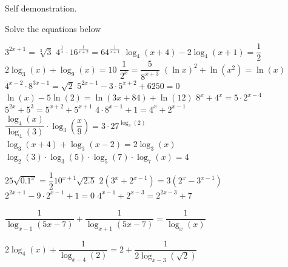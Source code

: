 \begin{Answer}\phantom{}
   Self demonstration.
\end{Answer}

\begin{Exercise} Solve the equations below
\begin{multicols}{2}
    \Question[difficulty = 1] $3^{2x+1} = \sqrt[3]{3}$ 
    \Question[difficulty = 1] $4^{\frac{1}{x}} \cdot 16^{\frac{1}{x+2}} = 64^{\frac{1}{x+1}} $
	\Question[difficulty = 1] $\log_4(x+4) - 2\log_4(x+1) = \dfrac{1}{2}$ 
	\Question[difficulty = 1] $2\log_{3} \left(x\right) + \log_{9} \left(x\right) = 10$ %
	\Question[difficulty = 1] $\dfrac{1}{2^x} = \dfrac{5}{8^{x+3}}$ 
	\Question[difficulty = 1] $(\ln x)^2+\ln (x^2)=\ln \left(x\right)$
	\Question[difficulty = 1] $4^{x-2}\cdot 8^{3x-1}=\sqrt{2}$ 
	\ifanalysis\Question[difficulty = 1]\fi\ifcalculus\Question[difficulty = 2]\fi $5^{2x-1}-3 \cdot 5^{x+2}+6250=0$ 
	\Question[difficulty = 1] $\ln (x)-5 \ln (2)=\ln(3x+84)+\ln (12)$
    \ifanalysis\Question[difficulty = 1]\fi\ifcalculus\Question[difficulty = 2]\fi $8^{x} + 4^{x}= 5\cdot 2^{x-4}$ 
    \ifanalysis\Question[difficulty = 1]\fi\ifcalculus\Question[difficulty = 2]\fi $5^{2x}+5^{3}=5^{x+2}+5^{x+1}$
	\ifanalysis\Question[difficulty = 1]\fi\ifcalculus\Question[difficulty = 2]\fi $4\cdot8^{x-1}+1=4^{x}+2^{x-1}$
	\Question[difficulty = 2] $\dfrac{\log_{4} (x)}{\log_{4} (3)}\cdot\log_{3} \left( \dfrac{x}{9} \right) = 3\cdot27^{\log_3(2)}$  
	\Question[difficulty = 1] $\log_{3}(x+4) + \log_{3}(x-2) = 2 \log_{3} (x)$ 
	\Question[difficulty = 1] $\log_2 (3) \cdot \log_3 (5)\cdot \log_5(7)\cdot\log_7 (x) = 4$ 

	\ifanalysis
	\Question[difficulty = 2] $25 \sqrt{0.1^x} = \dfrac{1}{2}10^{x+1} \sqrt{2.5}$ 
	\Question[difficulty = 1] $2 (3^x + 2^{x-1}) = 3(2^x-3^{x-1})$ 
	\Question[difficulty = 1] $2^{2x+1}-9\cdot2^{x-1}+1=0$ 
	\Question[difficulty = 1] $4^{x-1}+2^{x-3}=2^{2x-3}+7$
	\Question[difficulty = 2] \begin{small} $\dfrac{1}{\log_{x-1} (5x-7)}+ \dfrac{1}{\log_{x+1} (5x-7)} = \dfrac{1}{\log_{x} (x)}$ \end{small}
	\Question[difficulty = 2] \begin{small}$2 \log_4(x)+\dfrac{1}{\log_{x-4} (2)}=2+\dfrac{1}{2\log_{x-3} (\sqrt{2})}$ \end{small}
	\fi
    \EndCurrentQuestion	
\end{multicols}

\end{Exercise}

